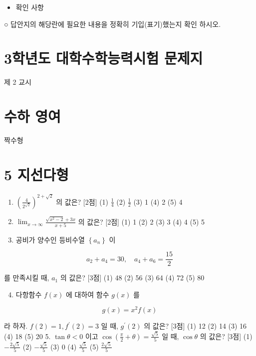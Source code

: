 \documentclass[10pt]{article}
\begin{document}
\begin{itemize}
  \item 확인 사항
\end{itemize}

○ 답안지의 해당란에 필요한 내용을 정확히 기입(표기)했는지 확인 하시오.

\section{3학년도 대학수학능력시험 문제지}
제 2 교시

\section{수하 영여}
짝수형

\section{5 지선다형}
\begin{enumerate}
  \item $\left(\frac{4}{2^{\sqrt{2}}}\right)^{2+\sqrt{2}}$ 의 값은? [2점]
(1) $\frac{1}{4}$
(2) $\frac{1}{2}$
(3) 1
(4) 2
(5) 4

  \item $\lim _{x \rightarrow \infty} \frac{\sqrt{x^{2}-2}+3 x}{x+5}$ 의 값은? [2점]
(1) 1
(2) 2
(3) 3
(4) 4
(5) 5

  \item 공비가 양수인 등비수열 $\left\{a_{n}\right\}$ 이

\end{enumerate}

$$
a_{2}+a_{4}=30, \quad a_{4}+a_{6}=\frac{15}{2}
$$

를 만족시킬 때, $a_{1}$ 의 값은? [3점]
(1) 48
(2) 56
(3) 64
(4) 72
(5) 80

\begin{enumerate}
  \setcounter{enumi}{3}
  \item 다항함수 $f(x)$ 에 대하여 함수 $g(x)$ 를
\end{enumerate}

$$
g(x)=x^{2} f(x)
$$

라 하자. $f(2)=1, f^{\prime}(2)=3$ 일 때, $g^{\prime}(2)$ 의 값은? [3점]
(1) 12
(2) 14
(3) 16
(4) 18
(5) 20 5. $\tan \theta<0$ 이고 $\cos \left(\frac{\pi}{2}+\theta\right)=\frac{\sqrt{5}}{5}$ 일 때, $\cos \theta$ 의 값은? [3점]
(1) $-\frac{2 \sqrt{5}}{5}$
(2) $-\frac{\sqrt{5}}{5}$
(3) 0
(4) $\frac{\sqrt{5}}{5}$
(5) $\frac{2 \sqrt{5}}{5}$
\end{document}
